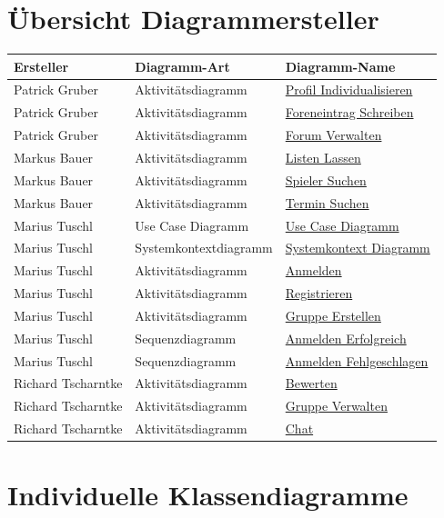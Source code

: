 \documentclass[DIV=13, 10pt,a4paper]{scrartcl}
\newcommand{\colorcell}[1]{\cellcolor{namecolor}\color{white}\textbf{#1}}
\begin{document}
\begin{appendices}
	\section{Übersicht Diagrammersteller}
	\label{app:B_DiagrammUebersicht}
	\begin{tabularx}{\linewidth}{|X|X|X|}
		\hline
		\colorcell{Ersteller} & \colorcell{Diagramm-Art} & \colorcell{Diagramm-Name}\\
		\hline
		Patrick Gruber&Aktivitätsdiagramm&\hyperref[fig:ActDia_Profil_Individualisieren]{Profil Individualisieren}\\
		\hline
		Patrick Gruber&Aktivitätsdiagramm&\hyperref[fig:ActDia_Foreneinntrag_Schreiben]{Foreneintrag Schreiben}\\
		\hline
		Patrick Gruber&Aktivitätsdiagramm&\hyperref[fig:ActDia_Forum_Verwalten]{Forum Verwalten}\\
		\hline
		\hline
		Markus Bauer&Aktivitätsdiagramm&\hyperref[fig:ActDia_Listen_Lassen]{Listen Lassen}\\
		\hline
		Markus Bauer&Aktivitätsdiagramm&\hyperref[fig:ActDia_Spieler_Suchen]{Spieler Suchen} \\
		\hline
		Markus Bauer&Aktivitätsdiagramm&\hyperref[fig:ActDia_Termin_Suchen]{Termin Suchen}\\
		\hline
		\hline
		Marius Tuschl&Use Case Diagramm&\hyperref[fig:UCD]{Use Case Diagramm}\\
		\hline
		Marius Tuschl&Systemkontextdiagramm&\hyperref[fig:SystemKontext]{Systemkontext Diagramm}\\
		\hline
		Marius Tuschl&Aktivitätsdiagramm&\hyperref[fig:ActDia_Anmelden]{Anmelden}\\
		\hline
		Marius Tuschl&Aktivitätsdiagramm&\hyperref[fig:ActDia_Registrieren]{Registrieren}\\
		\hline
		Marius Tuschl&Aktivitätsdiagramm&\hyperref[fig:ActDia_Gruppe_Erstellen]{Gruppe Erstellen}\\
		\hline
		Marius Tuschl&Sequenzdiagramm&\hyperref[fig:SeqDia_Anmelden_Erfolgreich]{Anmelden Erfolgreich}\\
		\hline
		Marius Tuschl&Sequenzdiagramm&\hyperref[fig:SeqDia_Anmelden_Fehlgeschlagen]{Anmelden Fehlgeschlagen}\\
		\hline
		\hline
		Richard Tscharntke&Aktivitätsdiagramm&\hyperref[fig:ActDia_Bewerten]{Bewerten}\\
		\hline
		Richard Tscharntke&Aktivitätsdiagramm&\hyperref[fig:ActDia_Gruppe_Verwalten]{Gruppe Verwalten}\\
		\hline
		Richard Tscharntke&Aktivitätsdiagramm&\hyperref[fig:ActDia_Chat]{Chat}\\
		\hline
	\end{tabularx}

	\section{Individuelle Klassendiagramme}
	\label{app:C_Klassendiagramme}
	
	
\end{appendices}
\end{document}

